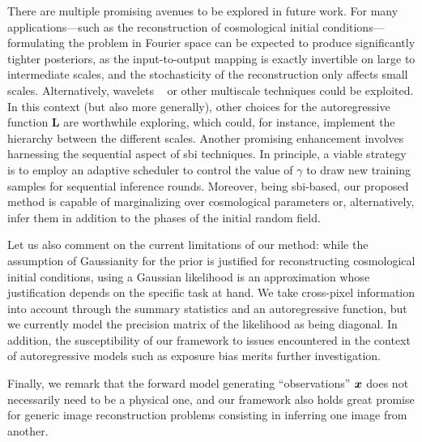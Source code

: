 There are multiple promising avenues to be explored in future work. For many applications---such as the reconstruction of cosmological initial conditions---formulating the problem in Fourier space can be expected to produce significantly tighter posteriors, as the input-to-output mapping is exactly invertible on large to intermediate scales, and the stochasticity of the reconstruction only affects small scales. Alternatively, wavelets ~\cite[\eg,][]{graps:1995introduction} or other multiscale techniques could be exploited.
In this context (but also more generally), other choices for the autoregressive function $\bm L$ are worthwhile exploring, which could, for instance, implement the hierarchy between the different scales. 
Another promising enhancement involves harnessing the sequential aspect of \gls*{sbi} techniques. In principle, a viable strategy is to employ an adaptive scheduler to control the value of $\gamma$ to draw new training samples for sequential inference rounds.
Moreover, being \gls*{sbi}-based, our proposed method is capable of marginalizing over cosmological parameters or, alternatively, infer them in addition to the phases of the initial random field.

Let us also comment on the current limitations of our method: while the assumption of Gaussianity for the prior is justified for reconstructing cosmological initial conditions, using a Gaussian likelihood is an approximation whose justification depends on the specific task at hand. We take cross-pixel information into account through the summary statistics and an autoregressive function, but we currently model the precision matrix of the likelihood as being diagonal. In addition, the susceptibility of our framework to issues encountered in the context of autoregressive models such as exposure bias \cite{bengio:2015scheduled} merits further investigation.

Finally, we remark that the forward model generating ``observations'' $\bm{x}$ does not necessarily need to be a physical one, and our framework also holds great promise for generic image reconstruction problems consisting in inferring one image from another.




